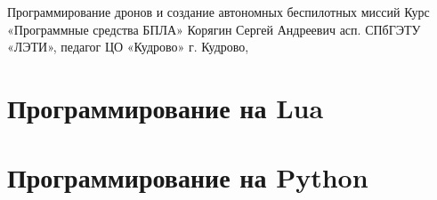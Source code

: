 \documentclass[
    fontsize=14pt,
    DIV=12,
    headings=big,
    numbers=noenddot,
    toc=listof,
    toc=bib,
    headinclude=true,
    footinclude=false
]{scrartcl}
\begin{document}
\makePioneerTitle
    {Программирование дронов и создание автономных беспилотных миссий}
    {Курс «Программные средства БПЛА»}
    {Корягин Сергей Андреевич}
    {асп. СПбГЭТУ «ЛЭТИ», педагог ЦО «Кудрово»}
    {г. Кудрово, \the\year}


\rmfamily

\tableofcontents
\clearpage


\clearpage





\clearpage

\part{Программирование на Lua}









\clearpage







\clearpage









\clearpage

\part{Программирование на Python}
\end{document}
